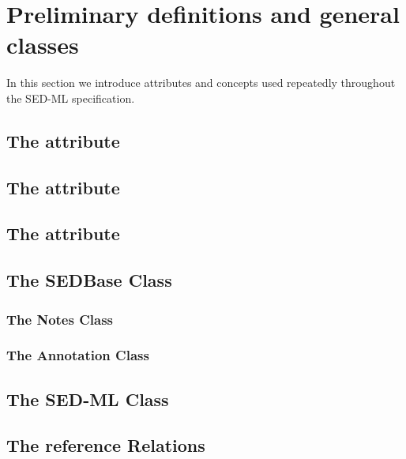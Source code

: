 
\section{Preliminary definitions and general classes}
In this section we introduce attributes and concepts used repeatedly throughout the SED-ML specification. 

\subsection{The  attribute}


\subsection{The   attribute}


\subsection{The  attribute}


\subsection{The SEDBase Class}


\subsubsection{The Notes Class}


\subsubsection{The Annotation Class}


\subsection{The SED-ML Class}


\subsection{The reference Relations}


